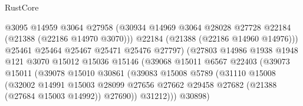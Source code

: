 \begin{lexlean}{RustCore}
\begin{coremodule}
                                      @3095
                                      @14959
                                      @3064
                                      @27958
                                      (@30934
                                        @14969
                                        @3064
                                        @28028
                                        @27728
                                        @22184
                                        (@21388 (@22186 @14970 @3070)))
                                      @22184
                                      (@21388 (@22186 @14960 @14976)))
                                    @25461
                                    @25464
                                    @25467
                                    @25471
                                    @25476
                                    @27797)
                                  (@27803
                                    @14986
                                    @1938
                                    @1948
                                    @121
                                    @3070
                                    @15012
                                    @15036
                                    @15146
                                    (@39068
                                      @15011
                                      @6567
                                      @22403
                                      (@39073
                                        @15011
                                        (@39078
                                          @15010
                                          @30861
                                          (@39083
                                            @15008
                                            @5789
                                            (@31110
                                              @15008
                                              (@32002
                                                @14991
                                                @15003
                                                @28099
                                                @27656
                                                @27662
                                                @29458
                                                @27682
                                                (@21388 (@27684 @15003 @14992))
                                                @27690))
                                            @31212)))
                                      @30898)

\end{coremodule}
\end{lexlean}
